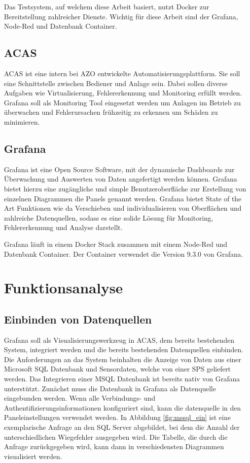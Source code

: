 \documentclass[a4paper, 12pt, oneside]{scrbook}
\begin{document}
			\noindent Das Testsystem, auf welchem diese Arbeit basiert, nutzt Docker zur Bereitstellung zahlreicher Dienste. Wichtig für diese Arbeit sind der Grafana, Node-Red und Datenbank Container.
			
		\section{ACAS}
			\noindent ACAS ist eine intern bei AZO entwickelte Automatisierungsplattform. Sie soll eine Schnittstelle zwischen Bediener und Anlage sein. Dabei sollen diverse Aufgaben wie Virtualisierung, Fehlererkennung und Monitoring erfüllt werden. Grafana soll als Monitoring Tool eingesetzt werden um Anlagen im Betrieb zu überwachen und Fehlerursachen frühzeitig zu erkennen um Schäden zu minimieren.
			
		\section{Grafana}
			\noindent Grafana ist eine Open Source Software, mit der dynamische Dashboards zur Überwachung und Auswerten von Daten angefertigt werden können. Grafana bietet hierzu eine zugängliche und simple Benutzeroberfläche zur Erstellung von einzelnen Diagrammen die Panels genannt werden. Grafana bietet State of the Art Funktionen wie da Verschieben und individualisieren von Oberflächen und zahlreiche Datenquellen, sodass es eine solide Lösung für Monitoring, Fehlererkennung und Analyse darstellt.
			
			\noindent Grafana läuft in einem Docker Stack zusammen mit einem Node-Red und Datenbank Container. Der Container verwendet die Version 9.3.0 von Grafana.
	
	\chapter{Funktionsanalyse}
	 
		\section{Einbinden von Datenquellen}
	 
			\noindent Grafana soll als Visualisierungswerkzeug in ACAS, dem bereits bestehenden System, integriert werden und die bereits bestehenden Datenquellen einbinden. Die Anforderungen an das System beinhalten die Anzeige von Daten aus einer Microsoft SQL Datenbank und Sensordaten, welche von einer SPS geliefert werden. Das Integrieren einer MSQL Datenbank ist bereits nativ von Grafana unterstützt. Zunächst muss die Datenbank in Grafana als Datenquelle eingebunden werden. Wenn alle Verbindungs- und Authentifizierungsinformationen konfiguriert sind, kann die datenquelle in den Paneleinstellungen verwendet werden. In Abbildung \ref{fig:mssql_ein} ist eine exemplarische Anfrage an  den SQL Server abgebildet, bei dem die Anzahl der unterschiedlichen Wiegefehler ausgegeben wird. Die Tabelle, die durch die Anfrage zurückgegeben wird, kann dann in verschiedensten Diagrammen visualisiert werden.
	 	
\end{document}
